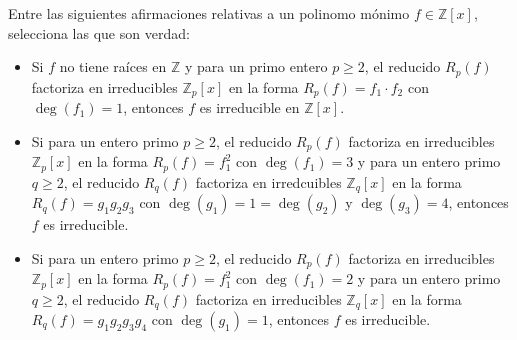 \begin{ejercicio*}
    Entre las siguientes afirmaciones relativas a un polinomo mónimo $f\in \mathbb{Z}[x]$, selecciona las que son verdad:
    \begin{itemize}
        \item Si $f$ no tiene raíces en $\mathbb{Z}$ y para un primo entero $p\geq 2$, el reducido $R_p(f)$ factoriza en irreducibles $\mathbb{Z}_p[x]$ en la forma $R_p(f) = f_1 \cdot f_2$ con $\deg(f_1)=1$, entonces $f$ es irreducible en $\mathbb{Z}[x]$.
        \item Si para un entero primo $p\geq 2$, el reducido $R_p(f)$ factoriza en irreducibles $\mathbb{Z}_p[x]$ en la forma $R_p(f) = f_1^2$ con $\deg(f_1)=3$ y para un entero primo $q\geq 2$, el reducido $R_q(f)$ factoriza en irredcuibles $\mathbb{Z}_q[x]$ en la forma $R_q(f)=g_1g_2g_3$ con $\deg(g_1)=1=\deg(g_2)$ y $\deg(g_3)=4$, entonces $f$ es irreducible.
        \item Si para un entero primo $p\geq 2$, el reducido $R_p(f)$ factoriza en irreducibles $\mathbb{Z}_p[x]$ en la forma $R_p(f)=f_1^2$ con $\deg(f_1)=2$ y para un entero primo $q\geq 2$, el reducido $R_q(f)$ factoriza en irreducibles $\mathbb{Z}_q[x]$ en la forma $R_q(f)=g_1g_2g_3g_4$ con $\deg(g_1)=1$, entonces $f$ es irreducible.
    \end{itemize}
\end{ejercicio*}

\newpage
\ %
\resetearcontador


\newpage
\resetearcontador
